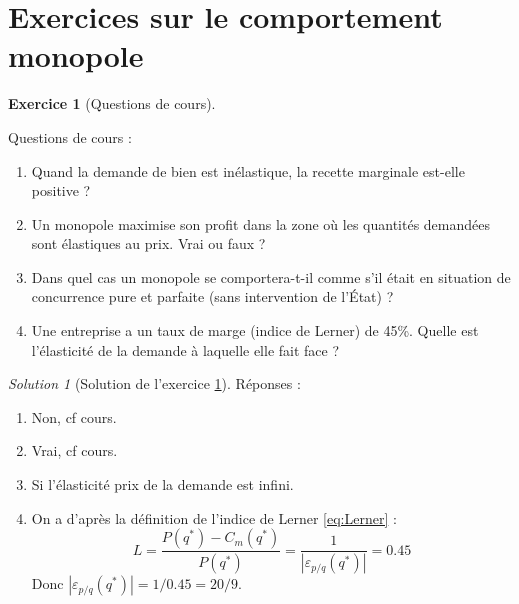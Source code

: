 \documentclass[
]{book}
\providecommand{\tightlist}{%
  \setlength{\itemsep}{0pt}\setlength{\parskip}{0pt}}
\theoremstyle{definition}
\theoremstyle{definition}
\theoremstyle{definition}
\newtheorem{exercise}{Exercice}[chapter]
\theoremstyle{definition}
\theoremstyle{remark}
\newtheorem*{solution}{Solution}
\begin{document}
\hypertarget{exercices-sur-le-comportement-monopole}{%
\section{Exercices sur le comportement monopole}\label{exercices-sur-le-comportement-monopole}}

\begin{exercise}[Questions de cours]
\protect\hypertarget{exr:monoexo1}{}\label{exr:monoexo1}

Questions de cours :

\begin{enumerate}
\def\labelenumi{\arabic{enumi}.}
\tightlist
\item
  Quand la demande de bien est inélastique, la recette
  marginale est-elle positive ?
\item
  Un monopole maximise son profit dans la zone où les
  quantités demandées sont élastiques au prix. Vrai ou faux ?
\item
  Dans quel cas un monopole se comportera-t-il comme
  s'il était en situation de concurrence pure et parfaite (sans
  intervention de l'État) ?
\item
  Une entreprise a un taux de marge (indice de Lerner) de 45\%.
  Quelle est l'élasticité de la demande à laquelle
  elle fait face ?
\end{enumerate}

\end{exercise}

\begin{solution}[Solution de l'exercice \ref{exr:monoexo1}]

Réponses :

\begin{enumerate}
\def\labelenumi{\arabic{enumi}.}
\tightlist
\item
  Non, cf cours.
\item
  Vrai, cf cours.
\item
  Si l'élasticité prix de la demande est infini.
\item
  On a d'après la définition de l'indice de Lerner \eqref{eq:Lerner} :
  \[L=\frac{P(q^*)-C_m(q^*)}{P(q^*)}=\frac{1}{\left|\varepsilon_{p/q}(q^*)\right|}=0.45\]
  Donc \(\left|\varepsilon_{p/q}(q^*)\right| =1/0.45=20/9\).
\end{enumerate}

\end{solution}
\end{document}
